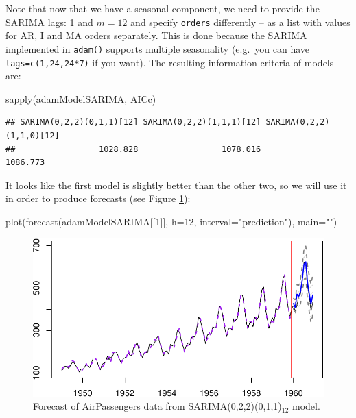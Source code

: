 \documentclass[
]{book}
\newenvironment{Shaded}{\begin{snugshade}}{\end{snugshade}}
\newcommand{\AttributeTok}[1]{\textcolor[rgb]{0.77,0.63,0.00}{#1}}
\newcommand{\DecValTok}[1]{\textcolor[rgb]{0.00,0.00,0.81}{#1}}
\newcommand{\FunctionTok}[1]{\textcolor[rgb]{0.00,0.00,0.00}{#1}}
\newcommand{\NormalTok}[1]{#1}
\newcommand{\StringTok}[1]{\textcolor[rgb]{0.31,0.60,0.02}{#1}}
\theoremstyle{definition}
\theoremstyle{definition}
\theoremstyle{definition}
\theoremstyle{definition}
\theoremstyle{remark}
\begin{document}
Note that now that we have a seasonal component, we need to provide the SARIMA lags: 1 and \(m=12\) and specify \texttt{orders} differently -- as a list with values for AR, I and MA orders separately. This is done because the SARIMA implemented in \texttt{adam()} supports multiple seasonality (e.g.~you can have \texttt{lags=c(1,24,24*7)} if you want). The resulting information criteria of models are:

\begin{Shaded}
\begin{Highlighting}[]
\FunctionTok{sapply}\NormalTok{(adamModelSARIMA, AICc)}
\end{Highlighting}
\end{Shaded}

\begin{verbatim}
## SARIMA(0,2,2)(0,1,1)[12] SARIMA(0,2,2)(1,1,1)[12] SARIMA(0,2,2)(1,1,0)[12] 
##                 1028.828                 1078.016                 1086.773
\end{verbatim}

It looks like the first model is slightly better than the other two, so we will use it in order to produce forecasts (see Figure \ref{fig:adamSARIMAPlotAir}):

\begin{Shaded}
\begin{Highlighting}[]
\FunctionTok{plot}\NormalTok{(}\FunctionTok{forecast}\NormalTok{(adamModelSARIMA[[}\DecValTok{1}\NormalTok{]], }\AttributeTok{h=}\DecValTok{12}\NormalTok{,}
              \AttributeTok{interval=}\StringTok{"prediction"}\NormalTok{),}
     \AttributeTok{main=}\StringTok{""}\NormalTok{)}
\end{Highlighting}
\end{Shaded}

\begin{figure}
\centering
\includegraphics{Svetunkov--2022----ADAM_files/figure-latex/adamSARIMAPlotAir-1.pdf}
\caption{\label{fig:adamSARIMAPlotAir}Forecast of AirPassengers data from SARIMA(0,2,2)(0,1,1)\(_{12}\) model.}
\end{figure}
\end{document}
